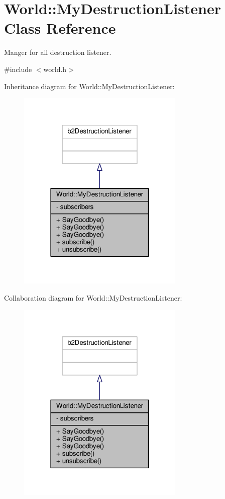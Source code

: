 \hypertarget{classWorld_1_1MyDestructionListener}{}\section{World\+:\+:My\+Destruction\+Listener Class Reference}
\label{classWorld_1_1MyDestructionListener}


Manger for all destruction listener.  




{\ttfamily \#include $<$world.\+h$>$}



Inheritance diagram for World\+:\+:My\+Destruction\+Listener\+:
\nopagebreak
\begin{figure}[H]
\begin{center}
\leavevmode
\includegraphics[width=226pt]{classWorld_1_1MyDestructionListener__inherit__graph}
\end{center}
\end{figure}


Collaboration diagram for World\+:\+:My\+Destruction\+Listener\+:
\nopagebreak
\begin{figure}[H]
\begin{center}
\leavevmode
\includegraphics[width=226pt]{classWorld_1_1MyDestructionListener__coll__graph}
\end{center}
\end{figure}
